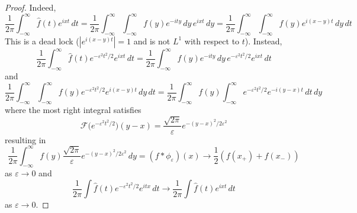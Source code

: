 \begin{proof}
Indeed,
\[\dfrac{1}{2\pi }\int ^{\infty }_{-\infty }\hat{f}(t)e^{ixt}\,dt=\dfrac{1}{2\pi }\int ^{\infty }_{-\infty }\int ^{\infty }_{-\infty }f(y)e^{-ity}\,dy\,e^{ixt}\,dy=\dfrac{1}{2\pi }\int ^{\infty }_{-\infty }\int ^{\infty }_{-\infty }f(y)e^{i(x-y)t}\,dy\,dt\]
This is a dead lock ($|e^{i(x-y)t}|=1$ and is not $L^{1}$ with respect to $t$). Instead, 
\[\dfrac{1}{2\pi }\int ^{\infty }_{-\infty }\hat{f}(t)e^{-\varepsilon ^2t^2/2}e^{ixt}\,dt=\dfrac{1}{2\pi }\int ^{\infty }_{-\infty }f(y)e^{-ity}\,dy\,e^{-\varepsilon ^2t^2/2}e^{ixt}\,dt\]
and
\[\dfrac{1}{2\pi }\int ^{\infty }_{-\infty }\int ^{\infty }_{-\infty }f(y)e^{-\varepsilon ^2t^2/2}e^{i(x-y)t}\,dy\,dt=\dfrac{1}{2\pi }\int ^{\infty }_{-\infty }f(y)\int ^{\infty }_{-\infty }e^{-\varepsilon ^2t^2/2}e^{-i(y-x)t}\,dt\,dy\]
where the most right integral satisfies
\[\mathcal{F}\Big(e^{-\varepsilon ^2t^2/2}\Big)(y-x)=\dfrac{\sqrt{2\pi }}{\varepsilon }e^{-(y-x)^2/2\varepsilon ^2}\]
resulting in 
\[\dfrac{1}{2\pi }\int ^{\infty }_{-\infty }f(y)\dfrac{\sqrt{2\pi }}{\varepsilon }e^{-(y-x)^2/2\varepsilon ^2}\,dy=(f\ast \phi _{\varepsilon })(x)\rightarrow \dfrac{1}{2}(f(x_{+})+f(x_{-}))\]
as $\varepsilon \rightarrow 0$ and
\[\dfrac{1}{2\pi }\int \hat{f}(t)e^{-\varepsilon ^2t^2/2}e^{itx}\,dt\rightarrow \dfrac{1}{2\pi }\int \hat{f}(t)e^{ixt}\,dt\]
as $\varepsilon \rightarrow 0$. 
\end{proof}
\vspace{2ex}

